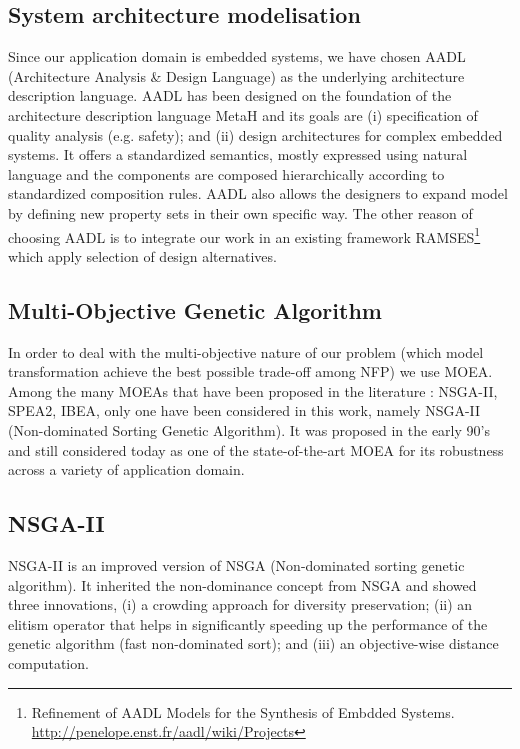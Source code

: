 \documentclass[conference]{IEEEtran}
\begin{document}
\subsection{System architecture modelisation}
Since our application domain is embedded systems, we have chosen AADL (Architecture Analysis \& Design Language) as the underlying architecture description language. AADL has been designed on the foundation of the architecture description language MetaH and its goals are (i) specification of quality analysis (e.g. safety); and (ii) design architectures for complex embedded systems. It offers a standardized semantics, mostly expressed using natural language and the components are composed hierarchically according to standardized composition rules. AADL also allows the designers to expand model by defining new property sets in their own specific way. The other reason of choosing AADL is to integrate our work in an existing framework RAMSES\footnote{Refinement of AADL Models for the Synthesis of Embdded Systems. \url{http://penelope.enst.fr/aadl/wiki/Projects}} which apply selection of design alternatives.

\subsection{Multi-Objective Genetic Algorithm}
In order to deal with the multi-objective nature of our problem (which model transformation achieve the best possible trade-off among NFP) we use MOEA. 
Among the many MOEAs that have been proposed in the literature : NSGA-II\cite{Deb:2002:FEM:2221359.2221582}, SPEA2\cite{Zitzler01spea2:improving}, IBEA\cite{Zitzler04indicatorbasedselection}, only one have been considered in this work, namely NSGA-II (Non-dominated Sorting Genetic Algorithm). It was proposed in the early 90's and still considered today as one of the state-of-the-art MOEA for its robustness across a variety of application domain.

\subsection{NSGA-II}
NSGA-II is an improved version of NSGA\cite{Srinivas94multiobjectiveoptimization} (Non-dominated sorting genetic algorithm). It inherited the non-dominance concept from NSGA and showed three innovations, (i) a crowding approach for diversity preservation; (ii) an elitism operator that helps in significantly speeding up the performance of the genetic algorithm (fast non-dominated sort); and (iii) an objective-wise distance computation. 
\end{document}
